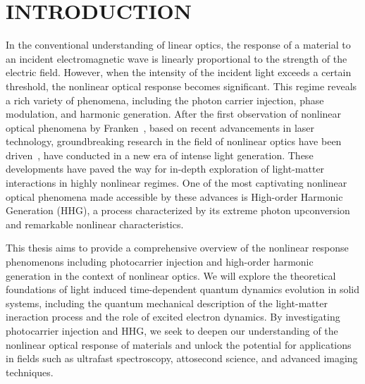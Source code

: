 

\chapter{INTRODUCTION }
\label{ch:introduction}
In the conventional understanding of linear optics, the response of a material to an incident
electromagnetic wave is linearly proportional to the strength of the electric field. However, when
the intensity of the incident light exceeds a certain threshold, the nonlinear optical response
becomes significant. This regime reveals a rich variety of phenomena, including the photon carrier
injection, phase modulation, and harmonic generation.
After the first observation of nonlinear optical phenomena by Franken~\cite{franken1961generation},
based on recent advancements in laser technology, groundbreaking research in the field of nonlinear
optics have been driven~\cite{RevModPhys.72.545, RevModPhys.81.163, MOUROU2012720}, have conducted in a new era of intense light generation. These developments have paved the way for in-depth exploration of light-matter interactions in highly nonlinear regimes. One of the most captivating nonlinear optical phenomena made accessible by these advances is High-order Harmonic Generation (\gls{HHG}), a process characterized by its extreme photon upconversion and remarkable nonlinear characteristics.

This thesis aims to provide a comprehensive overview of the nonlinear response phenomenons
including photocarrier injection and high-order harmonic generation in the context of nonlinear
optics. We will explore the theoretical foundations of light induced time-dependent quantum
dynamics evolution in solid systems,
including the quantum mechanical description of the light-matter ineraction process and the role of
excited electron dynamics.  By investigating photocarrier injection and HHG, we seek to deepen our understanding of the nonlinear optical response of materials and unlock the potential for applications in fields such as ultrafast spectroscopy, attosecond science, and advanced imaging techniques.
